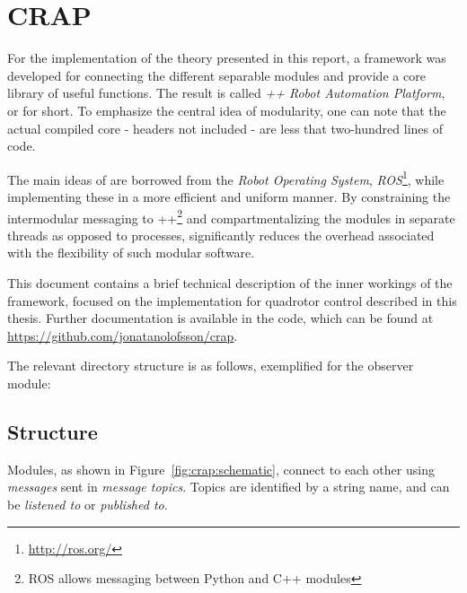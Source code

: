 \chapter{CRAP}
\label{app:crap}
    For the implementation of the theory presented in this report, a
    framework was developed for connecting the different separable modules
    and provide a core library of useful functions.
    The result is called \textit{\C++ Robot Automation Platform}, or \crap for short.
    To emphasize the central idea of modularity, one can note that the actual compiled
    core - headers not included - are less that two-hundred lines of code.

    The main ideas of \crap are borrowed from the \textit{Robot Operating System}, \textit{ROS}\footnote{\url{http://ros.org/}},
    while implementing these in a more efficient and uniform manner.
    By constraining the intermodular messaging to \C++\footnote{ROS allows messaging between Python and C++ modules} and compartmentalizing the
    modules in separate threads as opposed to processes, \crap significantly
    reduces the overhead associated with the flexibility of such modular software.

    This document contains a brief technical description of the inner workings of the framework,
    focused on the implementation for quadrotor control described in this thesis.
    Further documentation is available in the code, which can be found at
    \url{https://github.com/jonatanolofsson/crap}.

    The relevant directory structure is as follows,
    exemplified for the observer module:

    \begin{minipage}{\textwidth}
    \end{minipage}

    \section{Structure}
    \label{sec:crap:structure}
        Modules, as shown in Figure~\ref{fig:crap:schematic},
        connect to each other using \textit{messages} sent in \textit{message topics}.
        Topics are identified by a string name, and can be \textit{listened to} or \textit{published to}.

